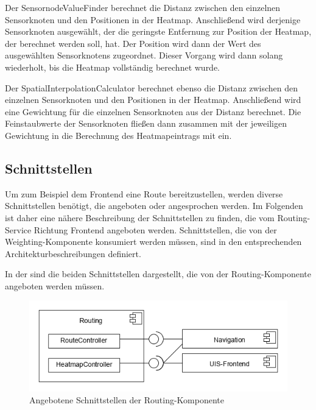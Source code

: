 Der SensornodeValueFinder berechnet die Distanz zwischen den einzelnen Sensorknoten und den Positionen in der Heatmap. Anschließend wird derjenige Sensorknoten ausgewählt, der die geringste Entfernung zur Position der Heatmap, der berechnet werden soll, hat. Der Position wird dann der Wert des ausgewählten Sensorknotens zugeordnet. Dieser Vorgang wird dann solang wiederholt, bis die Heatmap vollständig berechnet wurde.


Der SpatialInterpolationCalculator berechnet ebenso die Distanz zwischen den einzelnen Sensorknoten und den Positionen in der Heatmap. Anschließend wird eine Gewichtung für die einzelnen Sensorknoten aus der Distanz berechnet. Die Feinstaubwerte der Sensorknoten fließen dann zusammen mit der jeweiligen Gewichtung in die Berechnung des Heatmapeintrags mit ein.

\subsection{Schnittstellen}
Um zum Beispiel dem Frontend eine Route bereitzustellen, werden diverse Schnittstellen benötigt, die angeboten oder angesprochen werden. Im Folgenden ist daher eine nähere Beschreibung der Schnittstellen zu finden, die vom Routing-Service Richtung Frontend angeboten werden. Schnittstellen, die von der Weighting-Komponente konsumiert werden müssen, sind in den entsprechenden Architekturbeschreibungen definiert.

In der  sind die beiden Schnittstellen dargestellt, die von der Routing-Komponente angeboten werden müssen. 

\begin{figure}[htb]
	\centering
	\includegraphics[width=\textwidth]{./ressourcen/routing/architekturRoutingSchnitstellen.png}
	\caption{Angebotene Schnittstellen der Routing-Komponente}
	\label{fig:ArchitekturRoutingSchnitstellen}
\end{figure}

